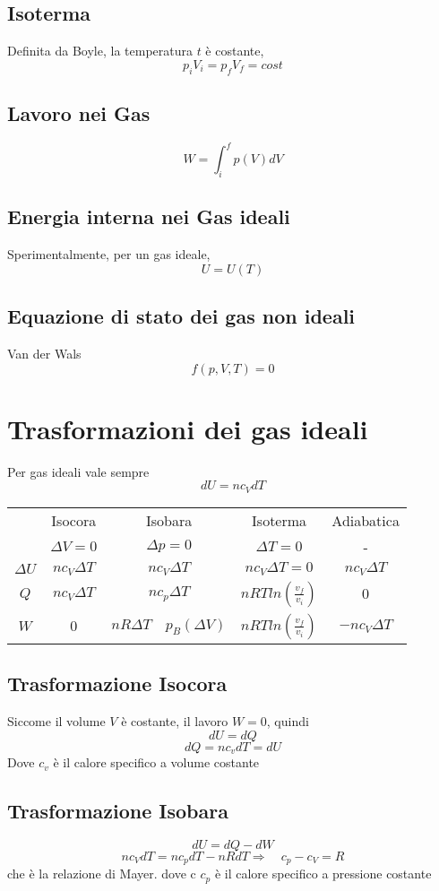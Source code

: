 \documentclass[a4paper]{report}
\begin{document}
  \subsection{Isoterma}
  Definita da Boyle, la temperatura $t$ è costante,
  $$ p_i V_i = p_f V_f = cost$$
  \subsection{Lavoro nei Gas}
  $$ W = \int_i^f p(V)dV $$
  \subsection{Energia interna nei Gas ideali}
  Sperimentalmente, per  un gas ideale,
  $$ U = U(T) $$
  \subsection{Equazione di stato dei gas non ideali}
  Van der Wals
  $$ f(p,V,T) = 0 $$

  \section{Trasformazioni dei gas ideali}
  Per gas ideali vale sempre
  $$ dU = n c_V dT $$
  \begin{center}
  \begin{tabular}{ |c|c|c|c|c| }
   \hline
    & Isocora & Isobara & Isoterma & Adiabatica \\
    & $\Delta V = 0$ & $\Delta p = 0$ & $\Delta T = 0$ & -\\
   \hline
   $\Delta U$ & $n c_V \Delta T$ & $n c_V \Delta T$ & $n c_V \Delta T = 0$ & $n c_V \Delta T$ \\
   $Q$ & $n c_V \Delta T$ & $n c_p \Delta T$ & $nRTln(\frac{v_f}{v_i})$ & $0$\\
   $W$ & $0$ & $ nR\Delta T \quad p_B(\Delta V)$ & $nRTln(\frac{v_f}{v_i})$ & $-n c_V \Delta T$ \\
   \hline
  \end{tabular}
  \end{center}
  \subsection{Trasformazione Isocora}
  Siccome il volume $V$ è costante, il lavoro $W = 0$, quindi
  $$ dU=dQ $$
  $$ dQ = nc_vdT = dU$$
  Dove $c_v$ è il calore specifico a volume costante
  \subsection{Trasformazione Isobara}
  $$ dU = dQ-dW $$
  $$ n c_V dT = n c_p dT - nR dT \Rightarrow \quad c_p -c_V = R $$
  che è la relazione di Mayer. dove c $c_p$ è il calore specifico a pressione costante
\end{document}
